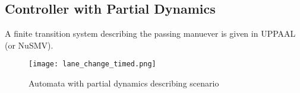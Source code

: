 \subsection{Controller with Partial Dynamics}
A finite transition system describing the passing manuever is given in UPPAAL (or NuSMV).
\begin{figure}[tb]
	\label{fig:discreteview}
	\centering
	\texttt{[image: lane\_change\_timed.png]}
	\caption{Automata with partial dynamics describing scenario}
\end{figure}